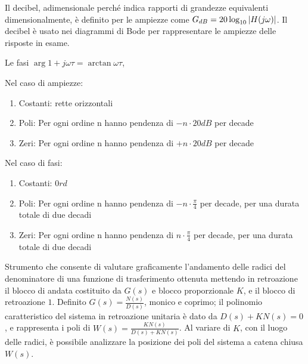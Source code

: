 Il decibel, adimensionale perché indica rapporti di grandezze equivalenti dimensionalmente, è definito per le ampiezze come $G_{dB} = 20\log_{10}{\left|H(j\omega)\right|}$. Il decibel è usato nei diagrammi di Bode per rappresentare le ampiezze delle risposte in esame.

Le fasi $\arg{1+j\omega \tau}=\arctan{\omega \tau}$, 

Nel caso di ampiezze:
\begin{enumerate}
    \item Costanti: rette orizzontali
    \item Poli: Per ogni ordine n hanno pendenza di $-n\cdot 20dB$ per decade 
    \item Zeri: Per ogni ordine n hanno pendenza di $+n\cdot 20dB$ per decade
\end{enumerate}

Nel caso di fasi:
\begin{enumerate}
    \item Costanti: $0 rd$
    \item Poli: Per ogni ordine n hanno pendenza di $-n\cdot \frac{\pi}{4}$ per decade, per una durata totale di due decadi
    \item Zeri: Per ogni ordine n hanno pendenza di $n\cdot \frac{\pi}{4}$ per decade, per una durata totale di due decadi
\end{enumerate}

Strumento che consente di valutare graficamente l'andamento delle radici del denominatore di una funzione di trasferimento ottenuta mettendo in retroazione il blocco di andata costituito da $G(s)$ e blocco proporzionale $K$, e il blocco di retroazione $1$. 
Definito $G(s)=\frac{N(s)}{D(s)}$, monico e coprimo; il polinomio caratteristico del sistema in retroazione unitaria è dato da $D(s) + K N(s) = 0$, e rappresenta i poli di $W(s)=\frac{K N(s)}{D(s) + K N(s)}$. Al variare di $K$, con il luogo delle radici, è possibile analizzare la posizione dei poli del sistema a catena chiusa $W(s)$.

